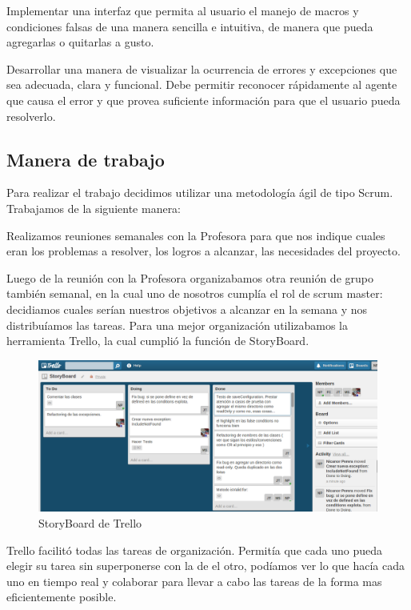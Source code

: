 \documentclass[a4paper,oneside,12pt]{article}
\begin{document}
Implementar una interfaz que permita al usuario el manejo de macros y condiciones falsas de una manera sencilla e intuitiva, de manera que pueda agregarlas o quitarlas a gusto.

Desarrollar una manera de visualizar la ocurrencia de errores y excepciones que sea adecuada, clara y funcional. Debe permitir reconocer r\'apidamente al agente que causa el error y que provea suficiente informaci\'on para que el usuario pueda resolverlo.

\subsection{Manera de trabajo}

Para realizar el trabajo decidimos utilizar una metodolog\'ia \'agil de tipo Scrum. Trabajamos de la siguiente manera: 

Realizamos reuniones semanales con la Profesora para que nos indique cuales eran los problemas a resolver, los logros a alcanzar, las necesidades del proyecto.

Luego de la reuni\'on con la Profesora organizabamos otra reuni\'on de grupo tambi\'en semanal, en la cual uno de nosotros cumpl\'ia el rol de scrum master: decidiamos cuales ser\'ian nuestros objetivos a alcanzar en la semana y nos distribu\'iamos las tareas. Para una mejor organizaci\'on utilizabamos la herramienta Trello, la cual cumpli\'o la funci\'on de StoryBoard.

\begin{figure}[h!]
  \centering
    \includegraphics[scale=0.27]{images/trello.png}
    \caption{StoryBoard de Trello}
    \label{trello}
\end{figure}

Trello facilit\'o todas las tareas de organizaci\'on. Permit\'ia que cada uno pueda elegir su tarea sin superponerse con la de el otro, pod\'iamos ver lo que hac\'ia cada uno en tiempo real y colaborar para llevar a cabo las tareas de la forma mas eficientemente posible. 
\end{document}
